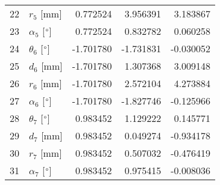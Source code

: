 \documentclass{standalone}%
\begin{document}
\begin{tabular}{llrrr}
22 &              $r_{5}$ [mm] &  0.772524 &   3.956391 &   3.183867 \\
23 &  $\alpha_{5}$ [$\degree$] &  0.772524 &   0.832782 &   0.060258 \\
24 &  $\theta_{6}$ [$\degree$] & -1.701780 &  -1.731831 &  -0.030052 \\
25 &              $d_{6}$ [mm] & -1.701780 &   1.307368 &   3.009148 \\
26 &              $r_{6}$ [mm] & -1.701780 &   2.572104 &   4.273884 \\
27 &  $\alpha_{6}$ [$\degree$] & -1.701780 &  -1.827746 &  -0.125966 \\
28 &  $\theta_{7}$ [$\degree$] &  0.983452 &   1.129222 &   0.145771 \\
29 &              $d_{7}$ [mm] &  0.983452 &   0.049274 &  -0.934178 \\
30 &              $r_{7}$ [mm] &  0.983452 &   0.507032 &  -0.476419 \\
31 &  $\alpha_{7}$ [$\degree$] &  0.983452 &   0.975415 &  -0.008036 \\
\bottomrule
\end{tabular}
%
\end{document}
